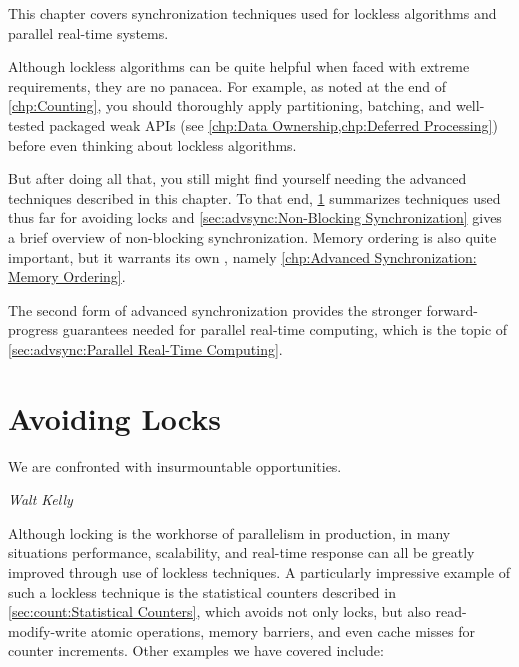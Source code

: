 
%

This chapter covers synchronization techniques used for lockless
algorithms and parallel real-time systems.

Although lockless algorithms can be quite helpful when faced with
extreme requirements, they are no panacea.
For example, as noted at the end of \cref{chp:Counting},
you should thoroughly apply partitioning, batching, and
well-tested packaged weak APIs
(see \cref{chp:Data Ownership,chp:Deferred Processing})
before even thinking about lockless algorithms.

But after doing all that, you still might find yourself needing the
advanced techniques described in this chapter.
To that end,
\cref{sec:advsync:Avoiding Locks}
summarizes techniques used thus far for avoiding locks and
\cref{sec:advsync:Non-Blocking Synchronization}
gives a brief overview of non-blocking synchronization.
Memory ordering is also quite important, but it warrants its own
, namely
\cref{chp:Advanced Synchronization: Memory Ordering}.

The second form of advanced synchronization provides the stronger
forward-progress guarantees needed for parallel real-time computing,
which is the topic of
\cref{sec:advsync:Parallel Real-Time Computing}.

\section{Avoiding Locks}
\label{sec:advsync:Avoiding Locks}
%
\epigraph{We are confronted with insurmountable opportunities.}
	 {\emph{Walt Kelly}}

Although locking is the workhorse of parallelism in production, in
many situations performance, scalability, and real-time response can
all be greatly improved through use of lockless techniques.
A particularly impressive example of such a lockless technique is
the statistical counters described in
\cref{sec:count:Statistical Counters},
which avoids not only locks, but also read-modify-write atomic operations,
memory barriers, and even cache misses for counter increments.
Other examples we have covered include:


